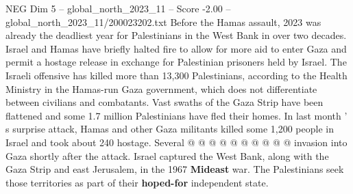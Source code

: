 \begin{textsample}{NEG Dim 5 – global\_north\_2023\_11 – Score -2.00 – global\_north\_2023\_11/200023202.txt}
Before the Hamas assault, 2023 was already the deadliest year for Palestinians in the West Bank in over two decades.
Israel and Hamas have briefly halted fire to allow for more aid to enter Gaza and permit a hostage release in exchange for Palestinian prisoners held by Israel.
The Israeli offensive has killed more than 13,300 Palestinians, according to the Health Ministry in the Hamas-run Gaza government, which does not differentiate between civilians and combatants.
Vast swaths of the Gaza Strip have been flattened and some 1.7 million Palestinians have fled their homes.
In last month ' s surprise attack, Hamas and other Gaza militants killed some 1,200 people in Israel and took about 240 hostage.
Several @ @ @ @ @ @ @ @ @ @ invasion into Gaza shortly after the attack.
Israel captured the West Bank, along with the Gaza Strip and east Jerusalem, in the 1967 \textbf{Mideast} war.
The Palestinians seek those territories as part of their \textbf{hoped-for} independent state.

\end{textsample}
